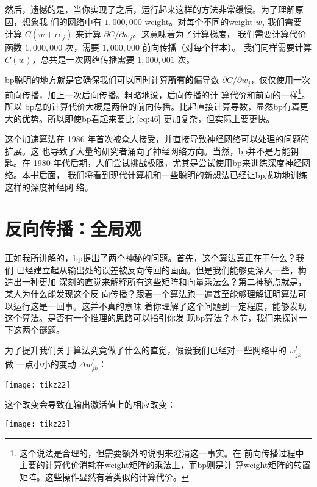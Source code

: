 然后，遗憾的是，当你实现了之后，运行起来这样的方法非常缓慢。为了理解原因，想象我
们的网络中有 $1,000,000$ \gls*{weight}。对每个不同的\gls*{weight} $w_j$ 我们需要
计算 $C(w+\epsilon e_j)$ 来计算 $\partial C/\partial w_j$。这意味着为了计算梯度，
我们需要计算代价函数 $1, 000, 000 $ 次，需要 $1, 000, 000$ 前向传播（对每个样本）。
我们同样需要计算 $C(w)$，总共是一次网络传播需要 $1,000,001$ 次。

\gls*{bp}聪明的地方就是它确保我们可以同时计算\textbf{所有的}偏导数 $\partial
C/\partial w_j$，仅仅使用一次前向传播，加上一次后向传播。粗略地说，后向传播的计
算代价和前向的一样\footnote{这个说法是合理的，但需要额外的说明来澄清这一事实。在
  前向传播过程中主要的计算代价消耗在\gls*{weight}矩阵的乘法上，而\gls*{bp}则是计
  算\gls*{weight}矩阵的转置矩阵。这些操作显然有着类似的计算代价。}。所以%
\gls*{bp}总的计算代价大概是两倍的前向传播。比起直接计算导数，显然\gls*{bp}有着更
大的优势。所以即使\gls*{bp}看起来要比 \eqref{eq:46} 更加复杂，但实际上要更快。

这个加速算法在 1986 年首次被众人接受，并直接导致神经网络可以处理的问题的扩展。这
也导致了大量的研究者涌向了神经网络方向。当然，\gls*{bp}并不是万能钥匙。在 1980
年代后期，人们尝试挑战极限，尤其是尝试使用\gls*{bp}来训练深度神经网络。本书后面，
我们将看到现代计算机和一些聪明的新想法已经让\gls*{bp}成功地训练这样的深度神经网
络。

\section{反向传播：全局观}
\label{sec:backpropagation_the_big_picture}

正如我所讲解的，\gls*{bp}提出了两个神秘的问题。首先，这个算法真正在干什么？我们
已经建立起从输出处的误差被反向传回的画面。但是我们能够更深入一些，构造出一种更加
深刻的直觉来解释所有这些矩阵和向量乘法么？第二神秘点就是，某人为什么能发现这个反
向传播？跟着一个算法跑一遍甚至能够理解证明算法可以运行这是一回事。这并不真的意味
着你理解了这个问题到一定程度，能够发现这个算法。是否有一个推理的思路可以指引你发
现\gls*{bp}算法？本节，我们来探讨一下这两个谜题。

为了提升我们关于算法究竟做了什么的直觉，假设我们已经对一些网络中的 $w_{jk}^l$ 做
一点小小的变动 $\Delta w_{jk}^l$：

\begin{center}
  \texttt{[image: tikz22]}
\end{center}

这个改变会导致在输出激活值上的相应改变：

\begin{center}
  \texttt{[image: tikz23]}
\end{center}

